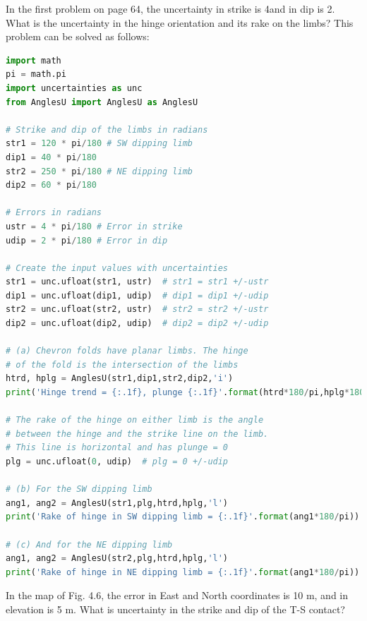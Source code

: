 \documentclass[a4paper , 12pt]{book}
\begin{document}
In the first problem on page 64, the uncertainty in strike is 4\degree and in dip is 2\degree. What is the uncertainty in the hinge orientation and its rake on the limbs? This problem can be solved as follows:

\begin{center}
\begin{lstlisting}[language=Python, frame=single]
import math
pi = math.pi
import uncertainties as unc
from AnglesU import AnglesU as AnglesU

# Strike and dip of the limbs in radians
str1 = 120 * pi/180 # SW dipping limb
dip1 = 40 * pi/180
str2 = 250 * pi/180 # NE dipping limb
dip2 = 60 * pi/180

# Errors in radians
ustr = 4 * pi/180 # Error in strike
udip = 2 * pi/180 # Error in dip

# Create the input values with uncertainties
str1 = unc.ufloat(str1, ustr)  # str1 = str1 +/-ustr
dip1 = unc.ufloat(dip1, udip)  # dip1 = dip1 +/-udip
str2 = unc.ufloat(str2, ustr)  # str2 = str2 +/-ustr
dip2 = unc.ufloat(dip2, udip)  # dip2 = dip2 +/-udip

# (a) Chevron folds have planar limbs. The hinge
# of the fold is the intersection of the limbs
htrd, hplg = AnglesU(str1,dip1,str2,dip2,'i')
print('Hinge trend = {:.1f}, plunge {:.1f}'.format(htrd*180/pi,hplg*180/pi))

# The rake of the hinge on either limb is the angle 
# between the hinge and the strike line on the limb. 
# This line is horizontal and has plunge = 0
plg = unc.ufloat(0, udip)  # plg = 0 +/-udip

# (b) For the SW dipping limb
ang1, ang2 = AnglesU(str1,plg,htrd,hplg,'l')
print('Rake of hinge in SW dipping limb = {:.1f}'.format(ang1*180/pi))

# (c) And for the NE dipping limb
ang1, ang2 = AnglesU(str2,plg,htrd,hplg,'l')
print('Rake of hinge in NE dipping limb = {:.1f}'.format(ang1*180/pi))
\end{lstlisting}
\end{center}

In the map of Fig. 4.6, the error in East and North coordinates is 10 m, and in elevation is 5 m. What is uncertainty in the strike and dip of the T-S contact? 
\end{document}
